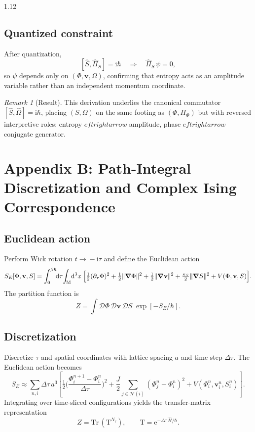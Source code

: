 \documentclass[12pt,a4paper]{article}
\numberwithin{equation}{section}
\theoremstyle{remark}
\newtheorem{remark}{Remark}[section]
\theoremstyle{definition}
\newcommand{\M}{\mathbb{M}}
\newcommand{\ii}{\mathrm{i}}
\newcommand{\ee}{\mathrm{e}}
\begin{document}
\begin{spacing}{1.12}
\subsection*{Quantized constraint}
After quantization,
\[
[\hat{S},\hat{\Pi}_S]=\ii\hbar
\quad\Rightarrow\quad
\hat{\Pi}_S\,\psi=0,
\]
so $\psi$ depends only on $(\Phi,\mathbf{v},\Omega)$,
confirming that entropy acts as an amplitude variable rather than an independent momentum coordinate.

\begin{remark}[Result]
This derivation underlies the canonical commutator
$[\hat{S},\hat{\Omega}]=\ii\hbar$,
placing $(S,\Omega)$ on the same footing as $(\Phi,\Pi_\Phi)$
but with reversed interpretive roles: entropy $eftrightarrow$ amplitude, phase $eftrightarrow$ conjugate generator.
\end{remark}

\section*{Appendix B: Path-Integral Discretization and Complex Ising Correspondence}
\label{appendix:B}

\subsection*{Euclidean action}
Perform Wick rotation $t\!\to\!-\ii\tau$ and define the Euclidean action
\[
S_E[\Phi,\mathbf{v},S]
=\int_0^{\beta\hbar}\!\!\dd\tau\!\int_{\M}\!\dd^3x\;
\Big[
\tfrac12(\partial_\tau\Phi)^2
+\tfrac12\|\grad\Phi\|^2
+\tfrac12\|\grad\mathbf{v}\|^2
+\tfrac{\kappa_S}{2}\|\grad S\|^2
+V(\Phi,\mathbf{v},S)
\Big].
\]
The partition function is
\[
Z=\!\!\int\!\mathcal{D}\Phi\,\mathcal{D}\mathbf{v}\,\mathcal{D}S\;
\exp[-S_E/\hbar].
\]

\subsection*{Discretization}
Discretize $\tau$ and spatial coordinates with lattice spacing $a$ and time step $\Delta\tau$.  
The Euclidean action becomes
\[
S_E \approx
\sum_{n,i}
\Delta\tau\,a^3
\!\left[
\tfrac12\Big(\frac{\Phi_i^{n+1}-\Phi_i^n}{\Delta\tau}\Big)^2
+\frac{J}{2}\sum_{j\in\mathcal{N}(i)}
(\Phi_j^n-\Phi_i^n)^2
+V(\Phi_i^n,\mathbf{v}_i^n,S_i^n)
\right].
\]
Integrating over time-sliced configurations yields the transfer-matrix representation
\[
Z = \mathrm{Tr}\,(\mathrm{T}^{N_\tau}),
\qquad
\mathrm{T}=\ee^{-\Delta\tau\,\hat{H}/\hbar}.
\]


\end{spacing}
\end{document}
